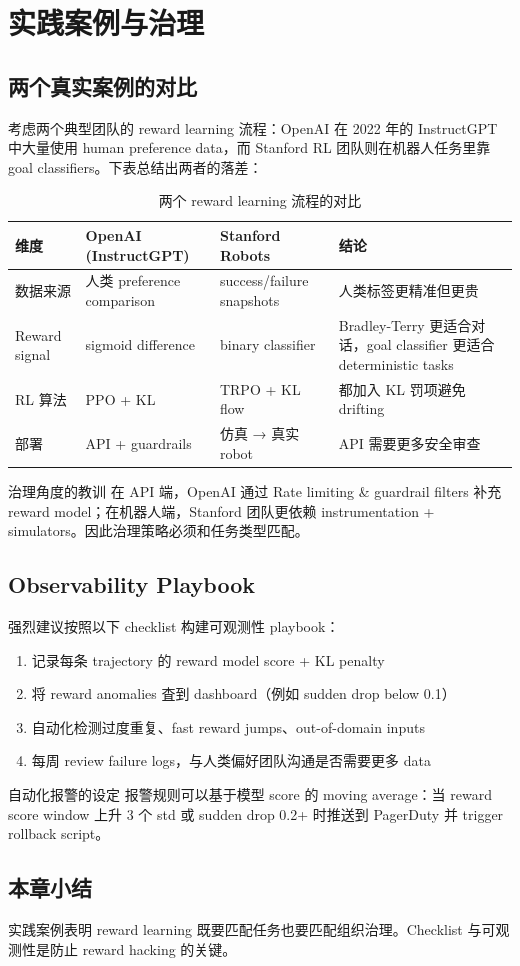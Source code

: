 \section{实践案例与治理}

\subsection{两个真实案例的对比}

考虑两个典型团队的 reward learning 流程：OpenAI 在 2022 年的 InstructGPT 中大量使用 human preference data，而 Stanford RL 团队则在机器人任务里靠 goal classifiers。下表总结出两者的落差：

\begin{table}[H]
\centering
\begin{tabular}{p{} p{} p{} p{}}
\toprule
维度 & OpenAI (InstructGPT) & Stanford Robots & 结论 \\
\midrule
数据来源 & 人类 preference comparison & success/failure snapshots & 人类标签更精准但更贵 \\
Reward signal & sigmoid difference & binary classifier & Bradley-Terry 更适合对话，goal classifier 更适合 deterministic tasks \\
RL 算法 & PPO + KL & TRPO + KL flow & 都加入 KL 罚项避免 drifting \\
部署 & API + guardrails & 仿真 → 真实 robot & API 需要更多安全审查 \\
\bottomrule
\end{tabular}
\caption{两个 reward learning 流程的对比}
\end{table}

\begin{warningbox}{治理角度的教训}
在 API 端，OpenAI 通过 Rate limiting & guardrail filters 补充 reward model；在机器人端，Stanford 团队更依赖 instrumentation + simulators。因此治理策略必须和任务类型匹配。
\end{warningbox}

\subsection{Observability Playbook}

强烈建议按照以下 checklist 构建可观测性 playbook：

\begin{enumerate}
    \item 记录每条 trajectory 的 reward model score + KL penalty
    \item 将 reward anomalies 査到 dashboard（例如 sudden drop below 0.1）
    \item 自动化检测过度重复、fast reward jumps、out-of-domain inputs
    \item 每周 review failure logs，与人类偏好团队沟通是否需要更多 data
\end{enumerate}

\begin{importantbox}{自动化报警的设定}
报警规则可以基于模型 score 的 moving average：当 reward score window 上升 3 个 std 或 sudden drop 0.2+ 时推送到 PagerDuty 并 trigger rollback script。
\end{importantbox}

\subsection{本章小结}

实践案例表明 reward learning 既要匹配任务也要匹配组织治理。Checklist 与可观测性是防止 reward hacking 的关键。

